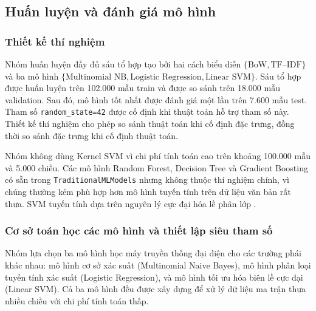 \documentclass[12pt]{hcmut-report}
\newcommand{\firstparagraph}{\noindent\hspace*{2em}}
\begin{document}
\subsection{Huấn luyện và đánh giá mô hình}

\subsubsection{Thiết kế thí nghiệm}

\firstparagraph Nhóm huấn luyện đầy đủ sáu tổ hợp tạo bởi hai cách biểu diễn $\{\text{BoW},\text{TF--IDF}\}$ và ba mô hình $\{\text{Multinomial NB},\text{Logistic Regression},\text{Linear SVM}\}$. Sáu tổ hợp được huấn luyện trên 102.000 mẫu train và được so sánh trên 18.000 mẫu validation. Sau đó, mô hình tốt nhất được đánh giá một lần trên 7.600 mẫu test. Tham số \texttt{random\_state=42} được cố định khi thuật toán hỗ trợ tham số này. Thiết kế thí nghiệm cho phép so sánh thuật toán khi cố định đặc trưng, đồng thời so sánh đặc trưng khi cố định thuật toán.

Nhóm không dùng Kernel SVM vì chi phí tính toán cao trên khoảng 100.000 mẫu và 5.000 chiều. Các mô hình Random Forest, Decision Tree và Gradient Boosting có sẵn trong \texttt{TraditionalMLModels} nhưng không thuộc thí nghiệm chính, vì chúng thường kém phù hợp hơn mô hình tuyến tính trên dữ liệu văn bản rất thưa. SVM tuyến tính dựa trên nguyên lý cực đại hóa lề phân lớp \cite{cortes1995svm}.

\subsubsection{Cơ sở toán học các mô hình và thiết lập siêu tham số}

\firstparagraph Nhóm lựa chọn ba mô hình học máy truyền thống đại diện cho các trường phái khác nhau: mô hình cơ sở xác suất (Multinomial Naive Bayes), mô hình phân loại tuyến tính xác suất (Logistic Regression), và mô hình tối ưu hóa biên lề cực đại (Linear SVM). Cả ba mô hình đều được xây dựng để xử lý dữ liệu ma trận thưa nhiều chiều với chi phí tính toán thấp.
\end{document}
